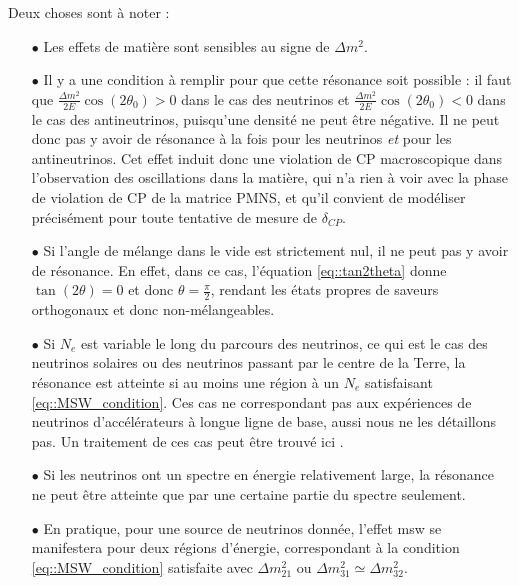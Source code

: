         Deux choses sont à noter : 
        \begin{itemize}
          \item[$\bullet$] Les effets de matière sont sensibles au signe de $\Delta m^2$.
          \item[$\bullet$] Il y a une condition à remplir pour que cette résonance soit possible : il faut que $\frac{\Delta m^2}{2E}\cos(2\theta_0) > 0$ dans le cas des neutrinos et $\frac{\Delta m^2}{2E}\cos(2\theta_0) < 0$ dans le cas des antineutrinos, puisqu'une densité ne peut être négative. Il ne peut donc pas y avoir de résonance à la fois pour les neutrinos \textit{et} pour les antineutrinos. Cet effet induit donc une violation de CP macroscopique dans l'observation des oscillations dans la matière, qui n'a rien à voir avec la phase de violation de CP de la matrice PMNS, et qu'il convient de modéliser précisément pour toute tentative de mesure de $\delta_{CP}$.
          \item[$\bullet$] Si l'angle de mélange dans le vide est strictement nul, il ne peut pas y avoir de résonance. En effet, dans ce cas, l'équation \eqref{eq::tan2theta} donne $\tan(2\theta)=0$ et donc $\theta=\frac{\pi}{2}$, rendant les états propres de saveurs orthogonaux et donc non-mélangeables.
          \item[$\bullet$] Si $N_e$ est variable le long du parcours des neutrinos, ce qui est le cas des neutrinos solaires ou des neutrinos passant par le centre de la Terre, la résonance est atteinte si au moins une région à un $N_e$ satisfaisant \eqref{eq::MSW_condition}. Ces cas ne correspondant pas aux expériences de neutrinos d'accélérateurs à longue ligne de base, aussi nous ne les détaillons pas. Un traitement de ces cas peut être trouvé ici \cite{Akhmedov2000}.
          \item[$\bullet$] Si les neutrinos ont un spectre en énergie relativement large, la résonance ne peut être atteinte que par une certaine partie du spectre seulement.
          \item[$\bullet$] En pratique, pour une source de neutrinos donnée, l'effet \gls{msw} se manifestera pour deux régions d'énergie, correspondant à la condition \eqref{eq::MSW_condition} satisfaite avec $\Delta m^2_{21}$ ou $\Delta m^2_{31}\simeq\Delta m^2_{32}$.
        \end{itemize}


